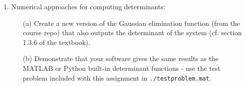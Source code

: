 \documentclass{article}
\begin{document}
\begin{enumerate}
  \item Numerical approaches for computing determinants:  
  \begin{itemize}
    \item[(a)] Create a new version of the Gaussian elimination function (from the course repo) that also outputs the determinant of the system (cf. section 1.3.6 of the textbook).  
    \item[(b)] Demonstrate that your software gives the same results as the MATLAB or Python built-in determinant functions - use the test problem included with this assignment in \texttt{./testproblem.mat}.  
    
  \end{itemize}
\end{enumerate}
\end{document}
